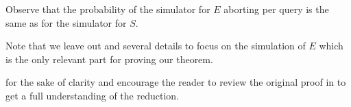\begin{center}
  \end{center}

Observe that the probability of the simulator for $E$ aborting per query is the same as for the simulator for $S$.

Note that we leave out and several details to focus on the simulation of $E$ which is the only relevant part for proving our theorem.



for the sake of clarity and encourage the reader to review the original proof in \cite{ecdsa-eufcma} to get a full understanding of the reduction.
